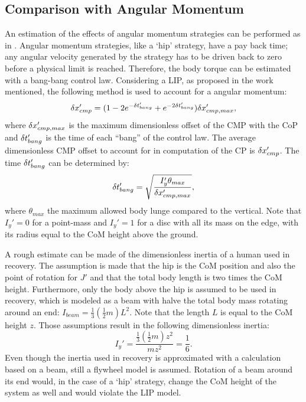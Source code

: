 \subsection{Comparison with Angular Momentum}
An estimation of the effects of angular momentum strategies can be performed as in \cite{koolen2012capturability}. Angular momentum strategies, like a `hip' strategy, have a pay back time; any angular velocity generated by the strategy has to be driven back to zero before a physical limit is reached. Therefore, the body torque can be estimated with a bang-bang control law.  Considering a \ac{LIP}, as proposed in the work mentioned, the following method is used to account for a angular momentum:
\begin{equation}
\delta x_{cmp}' = (1-2e^{-\delta t_{bang}'}+e^{-2\delta t_{bang}'})\delta x_{cmp,max}',
\end{equation}
where $\delta x_{cmp,max}'$ is the maximum dimensionless offset of the \ac{CMP} with the \ac{CoP} and $\delta t_{bang}'$ is the time of each ``bang'' of the control law. The average dimensionless \ac{CMP} offset to account for in computation of the \ac{CP} is $\delta x_{cmp}'$. The time $\delta t_{bang}'$ can be determined by:
\begin{equation}
\delta t_{bang}' = \sqrt{\frac{I_y'\theta_{max}}{\delta x_{cmp,max}'}},
\end{equation}
where $\theta_{max}$ the maximum allowed body lunge compared to the vertical. Note that $I_y'=0$ for a point-mass and $I_y'=1$ for a disc with all its mass on the edge, with its radius equal to the \ac{CoM} height above the ground. 

A rough estimate can be made of the dimensionless inertia of a human used in recovery. The assumption is made that the hip is the \ac{CoM} position and also the point of rotation for $J'$ and that the total body length is two times the \ac{CoM} height. Furthermore, only the body above the hip is assumed to be used in recovery, which is modeled as a beam with halve the total body mass rotating around an end: $I_{beam} = \frac{1}{3}(\frac{1}{2}m)L^2$. Note that the length $L$ is equal to the \ac{CoM} height $z$. Those assumptions result in the following dimensionless inertia:
\begin{equation}
	I_y' = \frac{\frac{1}{3}(\frac{1}{2}m)z^2}{mz^2} = \frac{1}{6}.
\end{equation}
Even though the inertia used in recovery is approximated with a calculation based on a beam, still a flywheel model is assumed. Rotation of a beam around its end would, in the case of a `hip' strategy, change the \ac{CoM} height of the system as well and would violate the \ac{LIP} model.

